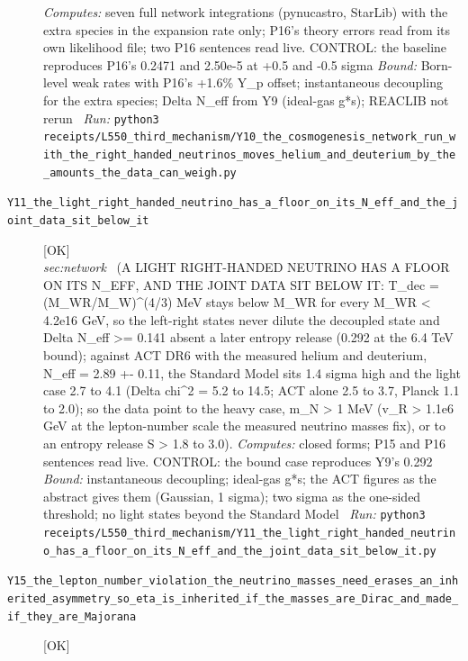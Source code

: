 \begin{description}
\emph{Computes:} seven full network integrations (pynucastro, StarLib) with the extra species in the expansion rate only; P16's theory errors read from its own likelihood file; two P16 sentences read live. CONTROL: the baseline reproduces P16's 0.2471 and 2.50e-5 at +0.5 and -0.5 sigma
 \emph{Bound:} Born-level weak rates with P16's +1.6\% Y\_p offset; instantaneous decoupling for the extra species; Delta N\_eff from Y9 (ideal-gas g*s); REACLIB not rerun
\ \emph{Run:} \texttt{python3 receipts/L550\_third\_mechanism/Y10\_the\_cosmogenesis\_network\_run\_with\_the\_right\_handed\_neutrinos\_moves\_helium\_and\_deuterium\_by\_the\_amounts\_the\_data\_can\_weigh.py}
\item[\label{rcpt:Y11_the_light_right_handed_neutrino_has_a_floor_on_its_N_eff_and_the_joint_data_sit_below_it}\textbf{}\quad\texttt{Y11\_the\_light\_right\_handed\_neutrino\_has\_a\_floor\_on\_its\_N\_eff\_and\_the\_joint\_data\_sit\_below\_it}]\hfill\textsf{[OK]}\\
\textit{sec:network} \ (A LIGHT RIGHT-HANDED NEUTRINO HAS A FLOOR ON ITS N\_EFF, AND THE JOINT DATA SIT BELOW IT: T\_dec = (M\_WR/M\_W)\textasciicircum{}(4/3) MeV stays below M\_WR for every M\_WR < 4.2e16 GeV, so the left-right states never dilute the decoupled state and Delta N\_eff >= 0.141 absent a later entropy release (0.292 at the 6.4 TeV bound); against ACT DR6 with the measured helium and deuterium, N\_eff = 2.89 +- 0.11, the Standard Model sits 1.4 sigma high and the light case 2.7 to 4.1 (Delta chi\textasciicircum{}2 = 5.2 to 14.5; ACT alone 2.5 to 3.7, Planck 1.1 to 2.0); so the data point to the heavy case, m\_N > 1 MeV (v\_R > 1.1e6 GeV at the lepton-number scale the measured neutrino masses fix), or to an entropy release S > 1.8 to 3.0). 
\emph{Computes:} closed forms; P15 and P16 sentences read live. CONTROL: the bound case reproduces Y9's 0.292
 \emph{Bound:} instantaneous decoupling; ideal-gas g*s; the ACT figures as the abstract gives them (Gaussian, 1 sigma); two sigma as the one-sided threshold; no light states beyond the Standard Model
\ \emph{Run:} \texttt{python3 receipts/L550\_third\_mechanism/Y11\_the\_light\_right\_handed\_neutrino\_has\_a\_floor\_on\_its\_N\_eff\_and\_the\_joint\_data\_sit\_below\_it.py}
\item[\label{rcpt:Y15_the_lepton_number_violation_the_neutrino_masses_need_erases_an_inherited_asymmetry_so_eta_is_inherited_if_the_masses_are_Dirac_and_made_if_they_are_Majorana}\textbf{}\quad\texttt{Y15\_the\_lepton\_number\_violation\_the\_neutrino\_masses\_need\_erases\_an\_inherited\_asymmetry\_so\_eta\_is\_inherited\_if\_the\_masses\_are\_Dirac\_and\_made\_if\_they\_are\_Majorana}]\hfill\textsf{[OK]}\\

\end{description}
